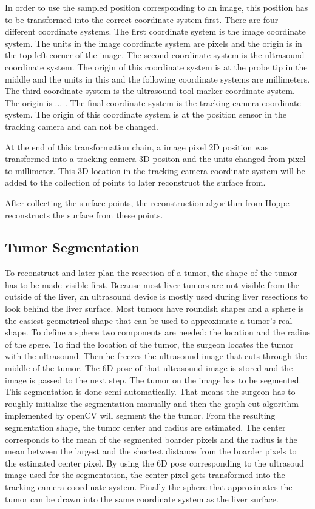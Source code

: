 In order to use the sampled position corresponding to an image, this
position has to be transformed into the correct coordinate system first. There
are four different coordinate systems. The first coordinate system is the image
coordinate system. The units in the image coordinate system are pixels and the
origin is in the top left corner of the image. The
second coordinate system is the ultrasound coordinate system. The origin of this
coordinate system is at the probe tip in the middle and the units in this and
the following coordinate systems are millimeters. The third coordinate system is the
ultrasound-tool-marker coordinate system. The origin is ... . The final
coordinate system is the tracking camera coordinate system. The origin of this
coordinate system is at the position sensor in the tracking camera and can not
be changed.

At the end of this transformation chain, a image pixel 2D position was
transformed into a tracking camera 3D positon and the units changed
from pixel to millimeter. This 3D location in the tracking camera coordinate system
will be added to the collection of points to later reconstruct the surface from.

After collecting the surface points, the reconstruction algorithm from Hoppe
\cite{hoppe1992surface} reconstructs the surface from these points.
\subsection{Tumor Segmentation}
To reconstruct and later plan the resection of a tumor, the shape
of the tumor has to be made visible first. Because most liver tumors are not visible from the outside of the liver, an
ultrasound device is mostly used during liver resections to look behind the
liver surface.
Most tumors have roundish shapes and a sphere is the easiest
geometrical shape that can be used to approximate a tumor's real shape. To
define a sphere two components are needed: the location and the radius of the
spere.
To find the location of the tumor, the surgeon locates the tumor with the
ultrasound. Then he freezes the ultrasound image that cuts through the middle of
the tumor. The 6D pose of that ultrasound image is stored and the image is
passed to the next step. The tumor on the image has to be segmented. This
segmentation is done semi automatically. That means the surgeon has to
roughly initialize the segmentation manually and then the graph cut algorithm
implemented by openCV will segment the the tumor. From the resulting
segmentation shape, the tumor center and radius are estimated. The center
corresponds to the mean of the segmented boarder pixels and the radius is the
mean between the largest and the shortest distance from the boarder pixels to
the estimated center pixel. By using the 6D pose corresponding to the ultrasoud
image used for the segmentation, the center pixel gets transformed into the
tracking camera coordinate system. Finally the sphere that approximates the
tumor can be drawn into the same coordinate system as the liver surface.
